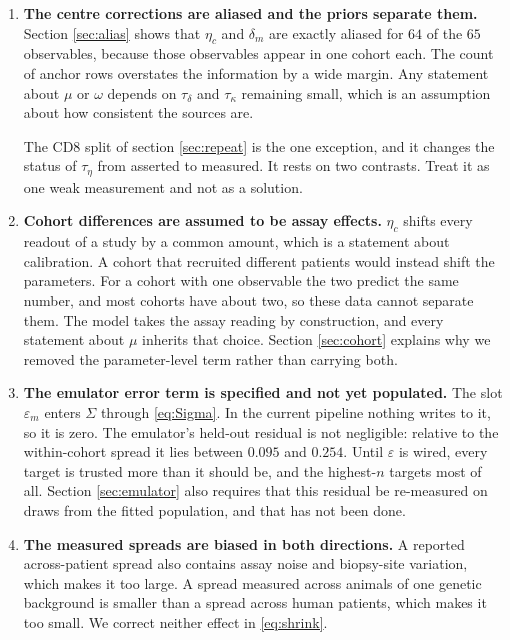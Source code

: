 \documentclass[11pt]{article}
\begin{document}
\begin{enumerate}[label=(\roman*)]
\item \textbf{The centre corrections are aliased and the priors separate them.}
Section \ref{sec:alias} shows that $\eta_c$ and $\delta_m$ are exactly aliased
for $64$ of the $65$ observables, because those observables appear in one cohort
each. The count of anchor rows overstates the information by a wide margin. Any
statement about $\mu$ or $\omega$ depends on $\tau_\delta$ and $\tau_\kappa$
remaining small, which is an assumption about how consistent the sources are.

The CD8 split of section \ref{sec:repeat} is the one exception, and it changes
the status of $\tau_\eta$ from asserted to measured. It rests on two contrasts.
Treat it as one weak measurement and not as a solution.

\item \textbf{Cohort differences are assumed to be assay effects.} $\eta_c$
shifts every readout of a study by a common amount, which is a statement about
calibration. A cohort that recruited different patients would instead shift the
parameters. For a cohort with one observable the two predict the same number, and
most cohorts have about two, so these data cannot separate them. The model takes
the assay reading by construction, and every statement about $\mu$ inherits that
choice. Section \ref{sec:cohort} explains why we removed the parameter-level term
rather than carrying both.

\item \textbf{The emulator error term is specified and not yet populated.} The
slot $\varepsilon_m$ enters $\Sigma$ through \eqref{eq:Sigma}. In the current
pipeline nothing writes to it, so it is zero. The emulator's held-out residual is
not negligible: relative to the within-cohort spread it lies between $0.095$ and
$0.254$. Until $\varepsilon$ is wired, every target is trusted more than it
should be, and the highest-$n$ targets most of all. Section \ref{sec:emulator}
also requires that this residual be re-measured on draws from the fitted
population, and that has not been done.

\item \textbf{The measured spreads are biased in both directions.} A reported
across-patient spread also contains assay noise and biopsy-site variation, which
makes it too large. A spread measured across animals of one genetic background
is smaller than a spread across human patients, which makes it too small. We
correct neither effect in \eqref{eq:shrink}.


\end{enumerate}
\end{document}
